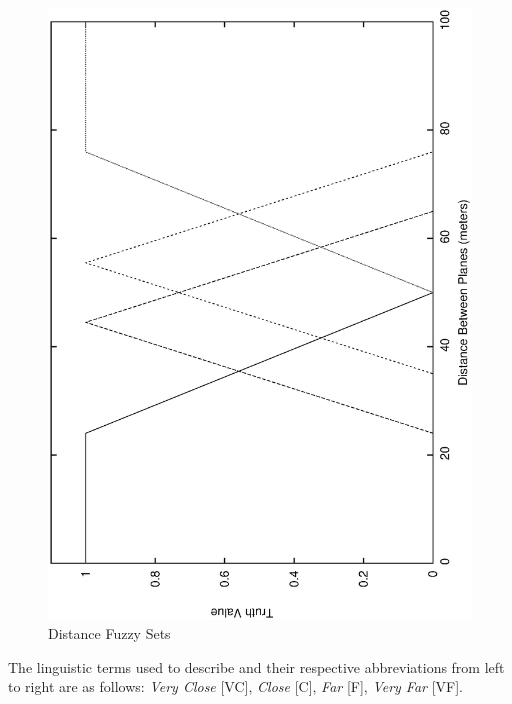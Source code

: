 \documentclass[10pt, conference, compsocconf]{IEEEtran}
\begin{document}
\begin{figure}[h]
\centering
\includegraphics[scale=0.35, angle=-90]{EPS/dist}
\caption{Distance Fuzzy Sets}
\label{fig:dist}
\end{figure}
The linguistic terms used to describe and their respective abbreviations from left to right are as follows: {\it Very Close} [VC], {\it Close} [C], {\it Far} [F], {\it Very Far} [VF].
\end{document}

